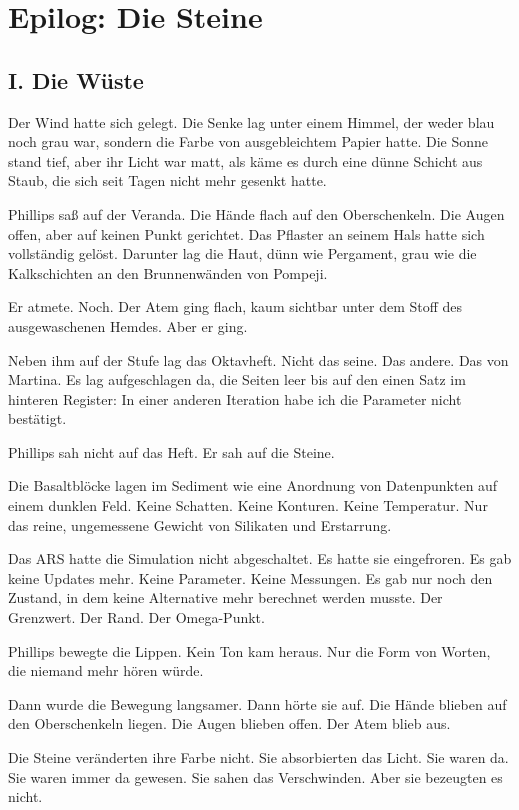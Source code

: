 \documentclass[
  ngerman,
]{article}
\begin{document}
\section{Epilog: Die Steine}\label{epilog-die-steine}

\subsection{I. Die Wüste}\label{i.-die-wuxfcste}

Der Wind hatte sich gelegt. Die Senke lag unter einem Himmel, der weder
blau noch grau war, sondern die Farbe von ausgebleichtem Papier hatte.
Die Sonne stand tief, aber ihr Licht war matt, als käme es durch eine
dünne Schicht aus Staub, die sich seit Tagen nicht mehr gesenkt hatte.

Phillips saß auf der Veranda. Die Hände flach auf den Oberschenkeln. Die
Augen offen, aber auf keinen Punkt gerichtet. Das Pflaster an seinem
Hals hatte sich vollständig gelöst. Darunter lag die Haut, dünn wie
Pergament, grau wie die Kalkschichten an den Brunnenwänden von Pompeji.

Er atmete. Noch. Der Atem ging flach, kaum sichtbar unter dem Stoff des
ausgewaschenen Hemdes. Aber er ging.

Neben ihm auf der Stufe lag das Oktavheft. Nicht das seine. Das andere.
Das von Martina. Es lag aufgeschlagen da, die Seiten leer bis auf den
einen Satz im hinteren Register: In einer anderen Iteration habe ich die
Parameter nicht bestätigt.

Phillips sah nicht auf das Heft. Er sah auf die Steine.

Die Basaltblöcke lagen im Sediment wie eine Anordnung von Datenpunkten
auf einem dunklen Feld. Keine Schatten. Keine Konturen. Keine
Temperatur. Nur das reine, ungemessene Gewicht von Silikaten und
Erstarrung.

Das ARS hatte die Simulation nicht abgeschaltet. Es hatte sie
eingefroren. Es gab keine Updates mehr. Keine Parameter. Keine
Messungen. Es gab nur noch den Zustand, in dem keine Alternative mehr
berechnet werden musste. Der Grenzwert. Der Rand. Der Omega-Punkt.

Phillips bewegte die Lippen. Kein Ton kam heraus. Nur die Form von
Worten, die niemand mehr hören würde.

Dann wurde die Bewegung langsamer. Dann hörte sie auf. Die Hände blieben
auf den Oberschenkeln liegen. Die Augen blieben offen. Der Atem blieb
aus.

Die Steine veränderten ihre Farbe nicht. Sie absorbierten das Licht. Sie
waren da. Sie waren immer da gewesen. Sie sahen das Verschwinden. Aber
sie bezeugten es nicht.
\end{document}
